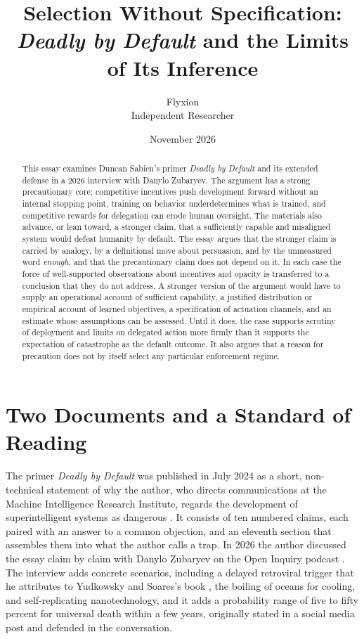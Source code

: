 \documentclass[11pt]{article}
\title{Selection Without Specification:\\ \textit{Deadly by Default} and the Limits of Its Inference}
\author{Flyxion\\ \small Independent Researcher}
\date{November 2026}
\begin{document}
\maketitle

\begin{abstract}
\noindent This essay examines Duncan Sabien's primer \textit{Deadly by Default} and its extended defense in a 2026 interview with Danylo Zubaryev. The argument has a strong precautionary core: competitive incentives push development forward without an internal stopping point, training on behavior underdetermines what is trained, and competitive rewards for delegation can erode human oversight. The materials also advance, or lean toward, a stronger claim, that a sufficiently capable and misaligned system would defeat humanity by default. The essay argues that the stronger claim is carried by analogy, by a definitional move about persuasion, and by the unmeasured word \textit{enough}, and that the precautionary claim does not depend on it. In each case the force of well-supported observations about incentives and opacity is transferred to a conclusion that they do not address. A stronger version of the argument would have to supply an operational account of sufficient capability, a justified distribution or empirical account of learned objectives, a specification of actuation channels, and an estimate whose assumptions can be assessed. Until it does, the case supports scrutiny of deployment and limits on delegated action more firmly than it supports the expectation of catastrophe as the default outcome. It also argues that a reason for precaution does not by itself select any particular enforcement regime.
\end{abstract}

\section{Two Documents and a Standard of Reading}

The primer \textit{Deadly by Default} was published in July 2024 as a short, non-technical statement of why the author, who directs communications at the Machine Intelligence Research Institute, regards the development of superintelligent systems as dangerous \citep{sabien2024}. It consists of ten numbered claims, each paired with an answer to a common objection, and an eleventh section that assembles them into what the author calls a trap. In 2026 the author discussed the essay claim by claim with Danylo Zubaryev on the Open Inquiry podcast \citep{zubaria2026}. The interview adds concrete scenarios, including a delayed retroviral trigger that he attributes to Yudkowsky and Soares's book \citeyearpar{yudkowsky2025}, the boiling of oceans for cooling, and self-replicating nanotechnology, and it adds a probability range of five to fifty percent for universal death within a few years, originally stated in a social media post and defended in the conversation.
\end{document}
